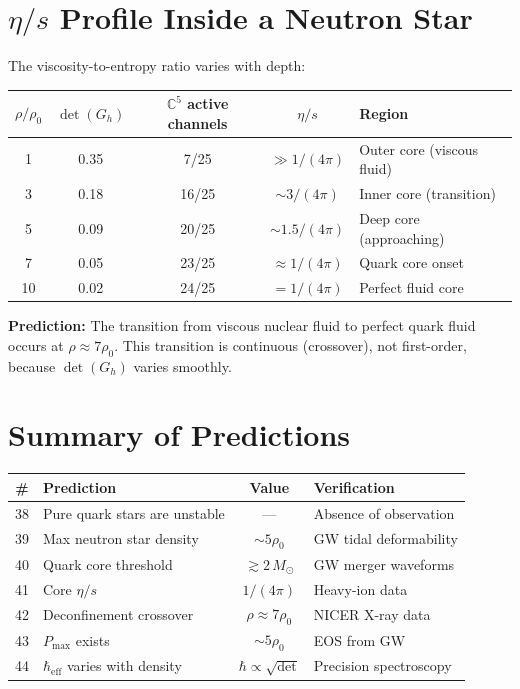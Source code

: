 \documentclass[12pt]{article}
\theoremstyle{definition}
\theoremstyle{remark}
\begin{document}
\section{$\eta/s$ Profile Inside a Neutron Star}

The viscosity-to-entropy ratio varies with depth:

\begin{center}
\begin{tabular}{ccccl}
\hline
$\rho/\rho_0$ & $\det(G_h)$ & $\mathbb{C}^5$ active channels & $\eta/s$ & Region \\
\hline
1 & 0.35 & 7/25 & $\gg 1/(4\pi)$ & Outer core (viscous fluid) \\
3 & 0.18 & 16/25 & $\sim 3/(4\pi)$ & Inner core (transition) \\
5 & 0.09 & 20/25 & $\sim 1.5/(4\pi)$ & Deep core (approaching) \\
7 & 0.05 & 23/25 & $\approx 1/(4\pi)$ & Quark core onset \\
10 & 0.02 & 24/25 & $= 1/(4\pi)$ & Perfect fluid core \\
\hline
\end{tabular}
\end{center}

\textbf{Prediction:} The transition from viscous nuclear fluid to perfect quark fluid occurs at $\rho \approx 7\rho_0$. This transition is continuous (crossover), not first-order, because $\det(G_h)$ varies smoothly.

\section{Summary of Predictions}

\begin{center}
\begin{tabular}{clcl}
\hline
\# & Prediction & Value & Verification \\
\hline
38 & Pure quark stars are unstable & --- & Absence of observation \\
39 & Max neutron star density & $\sim 5\rho_0$ & GW tidal deformability \\
40 & Quark core threshold & $\gtrsim 2\,M_\odot$ & GW merger waveforms \\
41 & Core $\eta/s$ & $1/(4\pi)$ & Heavy-ion data \\
42 & Deconfinement crossover & $\rho \approx 7\rho_0$ & NICER X-ray data \\
43 & $P_\text{max}$ exists & $\sim 5\rho_0$ & EOS from GW \\
44 & $\hbar_\text{eff}$ varies with density & $\hbar \propto \sqrt{\det}$ & Precision spectroscopy \\
\hline
\end{tabular}
\end{center}
\end{document}
